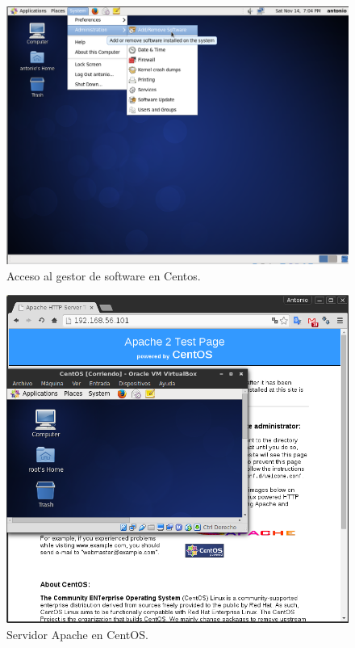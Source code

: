 \begin{figure}[H]
    \begin{center}
        \includegraphics[scale=0.31]{imagenes/img18}
        \caption{Acceso al gestor de software en Centos.}
        \label{fig18}
    \end{center}
\end{figure}

\begin{figure}[H]
    \begin{center}
        \includegraphics[scale=0.35]{imagenes/img19}
        \caption{Servidor Apache en CentOS.}
        \label{fig19}
    \end{center}
\end{figure}






